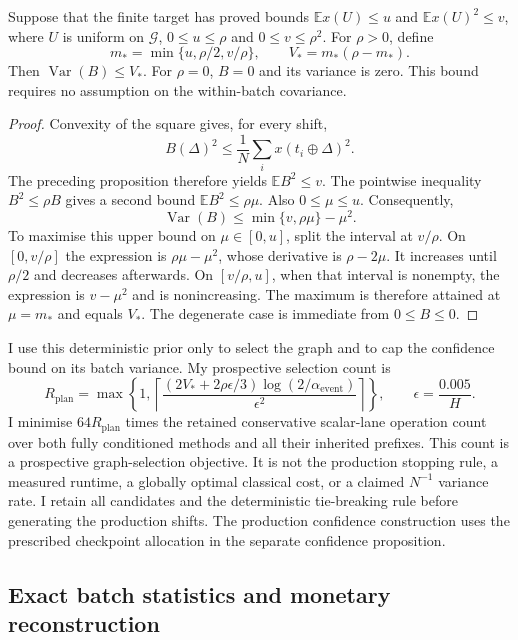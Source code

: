\begin{proposition}
\label{prop:rqmc-prior-variance}
Suppose that the finite target has proved bounds
$\mathbb E x(U)\leq u$ and $\mathbb E x(U)^2\leq v$, where $U$ is uniform
on $\mathcal G$, $0\leq u\leq\rho$ and $0\leq v\leq\rho^2$.
For $\rho>0$, define
\[
 m_* = \min\{u,\rho/2,v/\rho\},\qquad
 V_* = m_*(\rho-m_*).
\]
Then $\operatorname{Var}(B)\leq V_*$. For $\rho=0$, $B=0$ and its variance
is zero. This bound requires no assumption on the within-batch covariance.
\end{proposition}

\begin{proof}
Convexity of the square gives, for every shift,
\[
 B(\Delta)^2\leq\frac1N\sum_i x(t_i\oplus\Delta)^2.
\]
The preceding proposition therefore yields $\mathbb E B^2\leq v$.
The pointwise inequality $B^2\leq\rho B$ gives a second bound
$\mathbb E B^2\leq\rho\mu$. Also $0\leq\mu\leq u$. Consequently,
\[
 \operatorname{Var}(B)\leq\min\{v,\rho\mu\}-\mu^2.
\]
To maximise this upper bound on $\mu\in[0,u]$, split the interval at
$v/\rho$. On $[0,v/\rho]$ the expression is
$\rho\mu-\mu^2$, whose derivative is $\rho-2\mu$. It increases until
$\rho/2$ and decreases afterwards. On $[v/\rho,u]$, when that interval is
nonempty, the expression is $v-\mu^2$ and is nonincreasing. The maximum is
therefore attained at $\mu=m_*$ and equals $V_*$. The degenerate case is
immediate from $0\leq B\leq0$.
\end{proof}

I use this deterministic prior only to select the graph and to cap the
confidence bound on its batch variance. My prospective selection count is
\[
 R_{\mathrm{plan}}=
 \max\left\{1,
 \left\lceil
 \frac{(2V_*+2\rho\epsilon/3)\log(2/\alpha_{\mathrm{event}})}
      {\epsilon^2}
 \right\rceil\right\},
 \qquad \epsilon=\frac{0.005}{H}.
\]
I minimise $64R_{\mathrm{plan}}$ times the retained conservative scalar-lane
operation count over both fully conditioned methods and all their inherited
prefixes. This count is a prospective graph-selection objective. It is not
the production stopping rule, a measured runtime, a globally optimal
classical cost, or a claimed $N^{-1}$ variance rate. I retain all candidates
and the deterministic tie-breaking rule before generating the production
shifts. The production confidence construction uses the prescribed
checkpoint allocation in the separate confidence proposition.

\subsection{Exact batch statistics and monetary reconstruction}
\label{sec:rqmc-integer-reconstruction}

